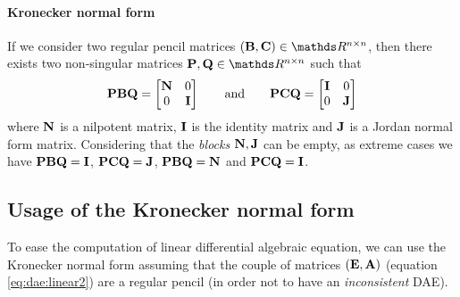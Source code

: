 	\paragraph{Kronecker normal form} If we consider two regular pencil matrices $(\mat B,\mat C) \in \mathds R^{n\times n}$, then there exists two non-singular matrices $\mat P, \mat Q \in \mathds R^{n\times n}$ such that 
	\begin{equation}
		\mathbf{P} \mathbf{B} \mathbf{Q} = \begin{bmatrix} \mathbf{N} & 0 \\ 0 & \mathbf{I} \end{bmatrix} \qquad \textrm{and} \qquad \mathbf{P} \mathbf{C} \mathbf{Q} = \begin{bmatrix} \mathbf{I} & 0 \\ 0 & \mathbf{J} \end{bmatrix}
	\end{equation}
	where $\mathbf{N}$ is a nilpotent matrix, $\mathbf{I}$ is the identity matrix and $\mathbf{J}$ is a Jordan normal form matrix. Considering that the \textit{blocks} $\mathbf{N},\mathbf{J}$ can be empty, as extreme cases we have $\mathbf{PBQ} = \mathbf{I}$, $\mathbf{PCQ} = \mathbf{J}$, $\mathbf{PBQ} = \mathbf{N}$ and $\mathbf{PCQ} = \mathbf{I}$.
	
	\subsection{Usage of the Kronecker normal form}
		To ease the computation of linear differential algebraic equation, we can use the Kronecker normal form assuming that the couple of matrices  $(\mathbf{E},\mathbf{A})$ (equation \ref{eq:dae:linear2}) are a regular pencil (in order not to have an \textit{inconsistent} DAE).
		

